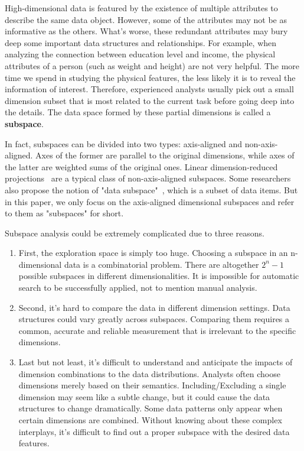 \maketitle

High-dimensional data is featured by the existence of multiple attributes to describe the same data object. However, some of the attributes may not be as informative as the others. What's worse, these redundant attributes may bury deep some important data structures and relationships. For example, when analyzing the connection between education level and income, the physical attributes of a person (such as weight and height) are not very helpful. The more time we spend in studying the physical features, the less likely it is to reveal the information of interest. Therefore, experienced analysts usually pick out a small dimension subset that is most related to the current task before going deep into the details. The data space formed by these partial dimensions is called a \textbf{subspace}.

In fact, subspaces can be divided into two types: axis-aligned and non-axis-aligned. Axes of the former are parallel to the original dimensions, while axes of the latter are weighted sums of the original ones. Linear dimension-reduced projections~\cite{fodor2002survey} are a typical class of non-axis-aligned subspaces. Some researchers also propose the notion of "data subspace"~\cite{DBLP:journals/tvcg/YuanRWG13}, which is a subset of data items. But in this paper, we only focus on the axis-aligned dimensional subspaces and refer to them as "subspaces" for short.

Subspace analysis could be extremely complicated due to three reasons. 
\begin{enumerate} [1).]
\item First, the exploration space is simply too huge. Choosing a subspace in an n-dimensional data is a combinatorial problem. There are altogether $2^{n}-1$ possible subspaces in different dimensionalities. It is impossible for automatic search to be successfully applied, not to mention manual analysis.
\item Second, it's hard to compare the data in different dimension settings. Data structures could vary greatly across subspaces. Comparing them requires a common, accurate and reliable measurement that is irrelevant to the specific dimensions.
\item Last but not least, it's difficult to understand and anticipate the impacts of dimension combinations to the data distributions. Analysts often choose dimensions merely based on their semantics. Including/Excluding a single dimension may seem like a subtle change, but it could cause the data structures to change dramatically. Some data patterns only appear when certain dimensions are combined. Without knowing about these complex interplays, it's difficult to find out a proper subspace with the desired data features.
\end{enumerate}


